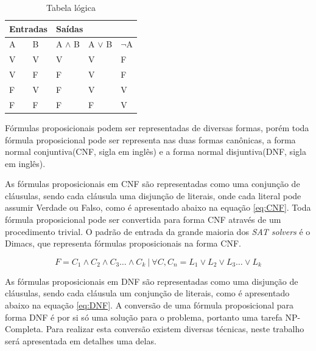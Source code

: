 \documentclass{ufsc-thesis}
\begin{document}

\begin{table}[H]
\begin{center}
\begin{tabular}{@{}|l|l|l|l|l|@{}}
\toprule
\multicolumn{2}{|l|}{\textbf{Entradas}} & \multicolumn{3}{l|}{\textbf{Saídas}} \\ \midrule
A                  & B                  & A $\wedge$ B         & A $\vee$  B         & $\neg$A        \\ \midrule
V                  & V                  & V           & V           & F        \\ \midrule
V                  & F                  & F           & V           & F        \\ \midrule
F                  & V                  & F           & V           & V        \\ \midrule
F                  & F                  & F           & F           & V        \\ \bottomrule
\end{tabular}
\caption{Tabela lógica}\label{tab:a}
\end{center}
\end{table}

Fórmulas proposicionais podem ser representadas de diversas formas, porém 
toda fórmula proposicional pode ser representa nas duas formas 
canônicas, a forma normal conjuntiva(CNF, sigla em inglês) e a 
forma normal disjuntiva(DNF, sigla em inglês).

As fórmulas proposicionais em CNF são representadas como uma 
conjunção de cláusulas, sendo cada cláusula uma disjunção de literais, 
onde cada literal pode assumir Verdade ou Falso, 
como é apresentado abaixo na equação \ref{eq:CNF}. Toda fórmula proposicional pode ser 
convertida para forma CNF através de um procedimento trivial. 
O padrão de entrada da grande maioria dos \textit{SAT solvers} é o Dimacs, 
que representa fórmulas proposicionais na forma CNF.

\begin{equation} \label{eq:CNF}
F = C_1\wedge C_2\wedge C_3 \dots \wedge C_k\ |\ \forall C, C_n = L_1\vee L_2 \vee L_3 \dots \vee L_k
\end{equation}

As fórmulas proposicionais em DNF são representadas como uma 
disjunção de cláusulas, sendo cada cláusula um conjunção de literais, 
como é apresentado abaixo na equação \ref{eq:DNF}. A conversão de uma fórmula proposicional 
para forma DNF é por si só uma solução para o problema, portanto 
uma tarefa NP-Completa. Para realizar esta conversão existem 
diversas técnicas, neste trabalho será apresentada em detalhes 
uma delas.
\end{document}
